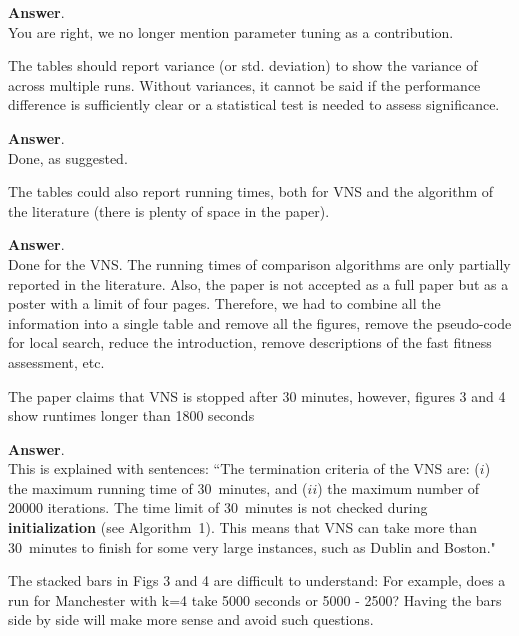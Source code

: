 \documentclass [11pt]{scrartcl}
\begin{document}
\textbf{Answer}. \\
You are right, we no longer mention parameter tuning as a contribution.
 

\begin{leftbar}
The tables should report variance (or std. deviation) to show the variance of across multiple runs. Without variances, it cannot be said if the performance difference is sufficiently clear or a statistical test is needed to assess significance.
\end{leftbar}

\textbf{Answer}. \\
Done, as suggested.

\begin{leftbar}
The tables could also report running times, both for VNS and the algorithm of the literature (there is plenty of space in the paper).
\end{leftbar}

\textbf{Answer}.\\
Done for the VNS. 
The running times of comparison algorithms are only partially reported in the literature.
Also, the paper is not accepted as a full paper but as a poster with a limit of four pages.
Therefore, we had to combine all the information into a single table and remove all the figures, remove the pseudo-code for local search, reduce the introduction, remove descriptions of the fast fitness assessment, etc.

\begin{leftbar}
The paper claims that VNS is stopped after 30 minutes, however, figures 3 and 4 show runtimes longer than 1800 seconds
\end{leftbar}

\textbf{Answer}. \\
This is explained with sentences:
``The termination criteria of the VNS are: ($i$) the maximum running time of 30~minutes, and ($ii$) the maximum number of 20000 iterations. The time limit of 30~minutes is not checked during \textbf{initialization} (see Algorithm~1). This means that VNS can take more than 30~minutes to finish for some very large instances, such as Dublin and Boston."

\begin{leftbar}
The stacked bars in Figs 3 and 4 are difficult to understand: For example, does a run for Manchester with k=4 take 5000 seconds or 5000 - 2500? Having the bars side by side will make more sense and avoid such questions.	
\end{leftbar}
\end{document}
